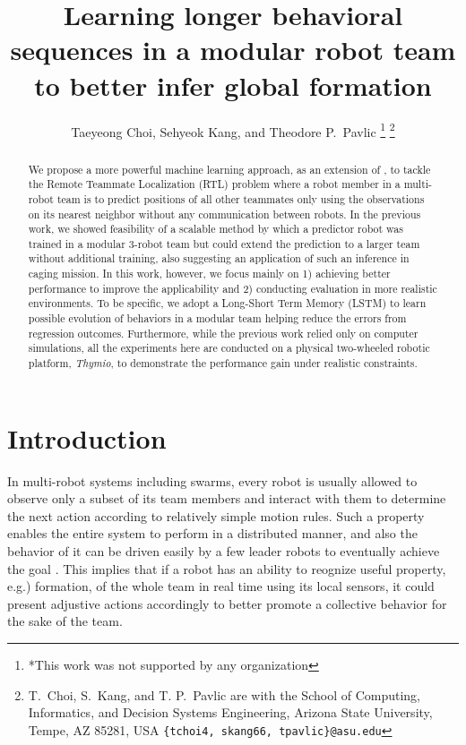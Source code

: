 \documentclass[letterpaper, 10 pt, conference]{ieeeconf}  %
\title{\LARGE \bf
	Learning longer behavioral sequences in a modular robot team  
	to better infer global formation
}
\author{Taeyeong Choi, Sehyeok Kang, and Theodore P.~Pavlic %
	\thanks{*This work was not supported by any organization}%
	\thanks{T.~Choi, S.~Kang, and T. P.~Pavlic are with the School of Computing, Informatics, and Decision Systems Engineering,
		Arizona State University, Tempe, AZ 85281, USA
		{\tt\small \{tchoi4, skang66, tpavlic\}@asu.edu}}%
}
\begin{document}
	
	
	
	\maketitle
	\thispagestyle{empty}
	\pagestyle{empty}
	
	
	\begin{abstract}
		
		We propose a more powerful machine learning approach, as an extension of \cite{CPR17},
		to tackle the Remote Teammate
		Localization (RTL) problem where a robot member in a multi-robot team is to predict positions
		of all other teammates only using the observations on its nearest neighbor without any
		communication between robots.
		In the previous work, we showed feasibility of a scalable method by which
		a predictor robot was trained in a modular 3-robot team but could extend the prediction
		to a larger
		team without additional training, also suggesting an application of such an inference in
		caging mission.         
		In this work, however, we focus mainly on 1) achieving better performance
		to improve the applicability and 2) conducting evaluation in
		more realistic environments. To be specific, we adopt a Long-Short Term Memory (LSTM)
		to learn possible evolution of behaviors in a modular team helping reduce the errors
		from regression outcomes. Furthermore, while the previous work relied only on computer simulations,
		all the experiments here are conducted on a physical two-wheeled robotic platform, \emph{Thymio},
		to demonstrate the performance gain under realistic constraints.
		
	\end{abstract}
	
	
	
	\section{Introduction}
	\label{sec:intro}
	
	In multi-robot systems including swarms, every robot is usually allowed to observe 
	only a subset of its team members and interact with them to determine the next action 
	according to relatively simple motion rules. 
	Such a property enables the entire system to perform in a distributed manner, and 
	also the behavior of it can be driven easily by a few leader robots to 
	eventually achieve the goal \cite{CPR17, DGRSS17, EB16}. 
	This implies that if a robot has an ability to reognize useful property, e.g.) formation, 
	of the whole team in real time using its local sensors, 
	it could present adjustive actions accordingly to better promote a collective behavior 
	for the sake of the team.
	
\end{document}
